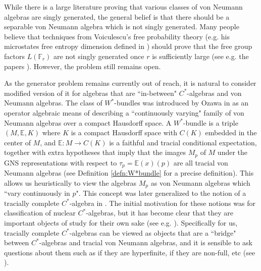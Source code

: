 \documentclass[10pt]{amsart}
\theoremstyle{definition}
\numberwithin{equation}{section}
\newcommand{\bE}{{\mathbb E}}
\newcommand{\bF}{{\mathbb F}}
\begin{document}
While there is a large literature proving that various classes of von Neumann algebras are singly generated, the general belief is that there should be a separable von Neumann algebra which is not singly generated. Many people believe that techniques from Voiculescu's free probability theory (e.g. his microstates free entropy dimension defined in \cite{Voiculescu1996}) should prove that the free group factors $L(\bF_{r})$ are not singly generated once $r$ is sufficiently large (see e.g. the papers \cite{SorinSSG,DimaNonMS}). However, the problem still remains open.

As the generator problem remains currently out of reach, it is natural to consider modified version of it for algebras that are ``in-between" $C^{*}$-algebras and von Neumann algebras. The class of $W^{*}$-bundles was introduced by Ozawa in \cite{OzawaBundle} as an operator algebraic means of describing a ``continuously varying" family of von Neumann algebras over a compact Hausdorff space. A $W^{*}$-bundle is a triple $(M,\bE,K)$ where $K$ is a compact Hausdorff space with $C(K)$ embedded in the  center of $M$, and $\bE\colon M\to C(K)$ is a faithful and tracial conditional expectation, together with extra hypotheses that imply that the images $M_{p}$ of $M$ under the GNS representations with respect to $\tau_{p}=\bE(x)(p)$ are all tracial von Neumann algebras (see Definition \ref{defn:W*bundle} for a precise definition). This allows us heuristically to view the algebras $M_{p}$ as von Neumann algebras which ``vary continuously in $p$". 
This concept was later generalized to the notion of a tracially complete $C^{*}$-algebra in \cite{TraciallyComplete}. The initial motivation for these notions was for classification of nuclear $C^{*}$-algebras, but it has become clear that they are important objects of study for their own sake (see e.g. \cite{ EvingtonTCC, Evington_thesis, EPBundles, mommaerts2026nonlocallytrivialmathrmwbundlefixed}). Specifically for us, tracially complete $C^{*}$-algebras can be viewed as objects that are a ``bridge" between $C^{*}$-algebras and tracial von Neumann algebras, and it is sensible to ask questions about them such as if they are hyperfinite, if they are non-full, etc (see \cite{TraciallyComplete, UnifGamma, UnifGamm3, UnifGamm2}). 
\end{document}
